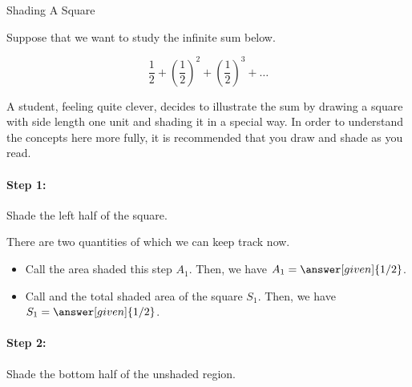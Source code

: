 \documentclass{ximera}
\begin{document}
\begin{example} Shading A Square

Suppose that we want to study the infinite sum below.

\[
\frac{1}{2} + \left(\frac{1}{2}\right)^2+ \left(\frac{1}{2}\right)^3+ \ldots
\]

A student, feeling quite clever, decides to illustrate the sum by drawing a square with side length one unit and shading it in a special way.  In order to understand the concepts here more fully, it is recommended that you draw and shade as you read.

\paragraph{Step 1:} Shade the left half of the square.  

\begin{image}[1in]

\end{image}
There are two quantities of which we can keep track now.
\begin{itemize}
\item Call the area shaded this step $A_1$.  Then, we have $A_1=\answer[given]{1/2}$.
\item Call and the total shaded area  of the square $S_1$.  Then, we have $S_1=\answer[given]{1/2}$.
\end{itemize}

\paragraph{Step 2:} Shade the bottom half of the unshaded region.  

\begin{image}[1in]
\end{image}
\end{example}
\end{document}
